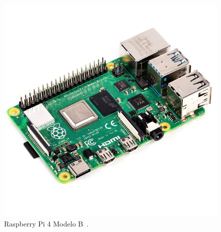 \begin{figure}[!htpb]
    \centering
    \includegraphics[width=.9\columnwidth]{figuras/rpi4.png}
    \caption{Raspberry Pi 4 Modelo B~\cite{rpi4}.}
    \label{fig:rpi4}
\end{figure}

\newpage






